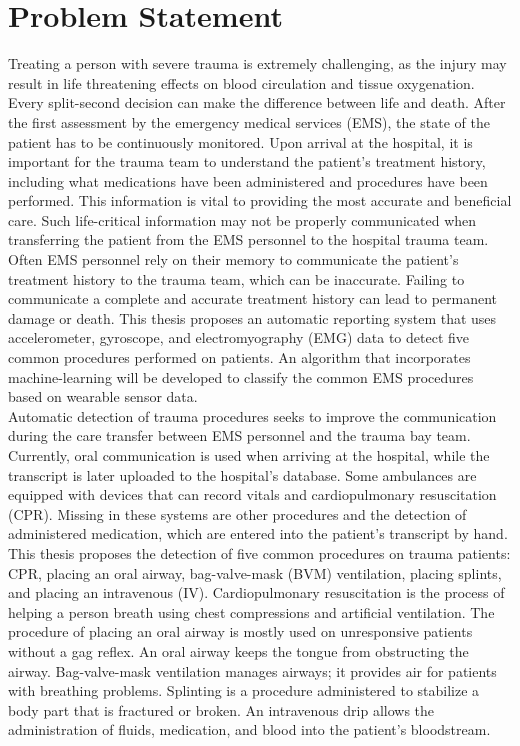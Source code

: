 
\chapter{Problem Statement}
\label{ch:Problem-Statement}

Treating a person with severe trauma is extremely challenging, as the injury may result in life threatening effects on blood circulation and tissue oxygenation. Every split-second decision can make the difference between life and death. After the first assessment by the emergency medical services (\gls{EMS}), the state of the patient has to be continuously monitored. Upon arrival at the hospital, it is important for the trauma team to understand the patient's treatment history, including what medications have been administered and procedures have been performed.  This information is vital to providing the most accurate and beneficial care. Such life-critical information may not be properly communicated when transferring the patient from the \gls{EMS} personnel to the hospital trauma team. Often \gls{EMS} personnel rely on their memory to communicate the patient's treatment history to the trauma team, which can be inaccurate. Failing to communicate a complete and accurate treatment history can lead to permanent damage or death. This thesis proposes an automatic reporting system that uses accelerometer, gyroscope, and electromyography (\gls{EMG}) data to detect five common procedures performed on patients. An algorithm that incorporates machine-learning will be developed to classify the common \gls{EMS} procedures based on wearable sensor data.\\
Automatic detection of trauma procedures seeks to improve the communication during the care transfer between EMS personnel and the trauma bay team. Currently, oral communication is used when arriving at the hospital, while the transcript is later uploaded to the hospital's database. Some ambulances are equipped with devices that can record vitals and cardiopulmonary resuscitation (\gls{CPR}). Missing in these systems are other procedures and the detection of administered medication, which are entered into the patient's transcript by hand. This thesis proposes the detection of five common procedures on trauma patients: \gls{CPR}, placing an oral airway, bag-valve-mask (\gls{BVM}) ventilation, placing splints, and placing an intravenous (\gls{IV}). Cardiopulmonary resuscitation is the process of helping a person breath using chest compressions and artificial ventilation. The procedure of placing an oral airway is mostly used on unresponsive patients without a gag reflex. An oral airway keeps the tongue from obstructing the airway. Bag-valve-mask ventilation manages airways; it provides air for patients with breathing problems. Splinting is a procedure administered to stabilize a body part that is fractured or broken. An intravenous drip allows the administration of fluids, medication, and blood into the patient’s bloodstream.\\
